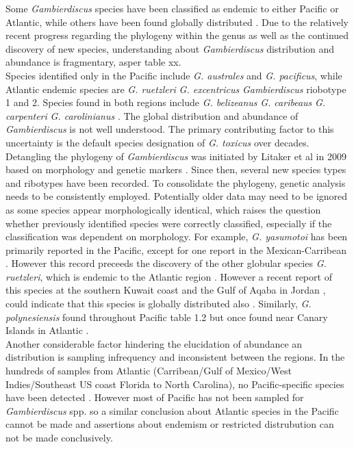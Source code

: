 \documentclass[12pt]{article}
\begin{document}
Some \emph{Gambierdiscus} species have been classified as endemic to either Pacific or Atlantic, while others have been found globally distributed \cite{berdalet2012global,litaker2010global}. Due to the relatively recent progress regarding the phylogeny within the genus as well as the continued discovery of new species, understanding about \emph{Gambierdiscus} distribution and abundance is fragmentary, asper table xx. \\
Species identified only in the Pacific include \emph{G. australes} and \emph{G. pacificus}, while Atlantic endemic species are \emph{G. ruetzleri} \emph{G. excentricus} \emph{Gambierdiscus} riobotype 1 and 2. Species found in both regions include \emph{G. belizeanus} \emph{G. caribeaus} \emph{G. carpenteri} \emph{G. carolinianus} \cite{litaker2010global,litaker2009taxonomy,berdalet2012global}. %
The global distribution and abundance of \emph{Gambierdiscus} is not well understood. The primary contributing factor to this uncertainty is the default species designation of \emph{G. toxicus} over decades. Detangling the phylogeny of \emph{Gambierdiscus} was initiated by Litaker et al in 2009 based on morphology and genetic markers \cite{litaker2009taxonomy}. Since then, several new species types and ribotypes have been recorded. To consolidate the phylogeny, genetic analysis needs to be consistently employed. Potentially older data may need to be ignored as some species appear morphologically identical, which raises the question whether previously identified species were correctly classified, especially if the classification was dependent on morphology.
For example, \emph{G. yasumotoi} has been primarily reported in the Pacific, except for one report in the Mexican-Carribean \cite{hernandez2004species}. However this record preceeds the discovery of the other globular species \emph{G. ruetzleri}, which is endemic to the Atlantic region \cite{litaker2009taxonomy}. However a recent report of this species at the southern Kuwait coast and the Gulf of Aqaba in Jordan \cite{saburova2013new}, could indicate that this species is globally distributed also \cite{xu2014distribution}.
Similarly, \emph{G. polynesiensis} found throughout Pacific table 1.2 but once found near Canary Islands in Atlantic \cite{fraga2011gambierdiscus}. \\
Another considerable factor hindering the elucidation of abundance an distribution is sampling infrequency and inconsistent between the regions. In the hundreds of samples from Atlantic (Carribean/Gulf of Mexico/West Indies/Southeast US coast Florida to North Carolina), no Pacific-specific species have been detected \cite{berdalet2012global,litaker2010global}. However most of Pacific has not been sampled for \emph{Gambierdiscus} spp. so a similar conclusion about Atlantic species in the Pacific cannot be made and assertions about endemism or restricted distrubution can not be made conclusively.
\end{document}
